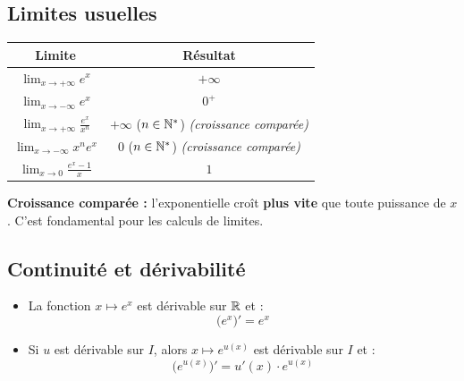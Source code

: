 \subsection{Limites usuelles}

\begin{propriete}
  \bigskip
  \begin{center}
  \renewcommand{\arraystretch}{2}
  \begin{tabular}{|c|c|}
    \hline
    \textbf{\color{navy}Limite}
      & \textbf{\color{navy}R\'{e}sultat} \\
    \hline\hline
    $\displaystyle\lim_{x \to +\infty} e^x$
      & $+\infty$ \\
    \hline
    $\displaystyle\lim_{x \to -\infty} e^x$
      & $0^+$ \\
    \hline
    $\displaystyle\lim_{x \to +\infty} \frac{e^x}{x^n}$
      & $+\infty$ \quad ($n \in \mathbb{N}^*$) \quad \textit{(croissance compar\'{e}e)} \\
    \hline
    $\displaystyle\lim_{x \to -\infty} x^n e^x$
      & $0$ \quad ($n \in \mathbb{N}^*$) \quad \textit{(croissance compar\'{e}e)} \\
    \hline
    $\displaystyle\lim_{x \to 0} \frac{e^x - 1}{x}$
      & $1$ \\
    \hline
  \end{tabular}
  \end{center}
\end{propriete}

\begin{remarque}
  \textbf{Croissance compar\'{e}e :} l'exponentielle cro\^{i}t
  \textbf{plus vite} que toute puissance de $x$.
  C'est fondamental pour les calculs de limites.
\end{remarque}

\subsection{Continuit\'{e} et d\'{e}rivabilit\'{e}}

\begin{propriete}[D\'{e}riv\'{e}e de $e^x$ et de $e^{u(x)}$]
  \begin{itemize}
    \item La fonction $x \mapsto e^x$ est d\'{e}rivable sur $\mathbb{R}$ et :
    \[
      \bigl(e^x\bigr)' = e^x
    \]
    \item Si $u$ est d\'{e}rivable sur $I$, alors $x \mapsto e^{u(x)}$
          est d\'{e}rivable sur $I$ et :
    \[
      \bigl(e^{u(x)}\bigr)' = u'(x) \cdot e^{u(x)}
    \]
  \end{itemize}
\end{propriete}

